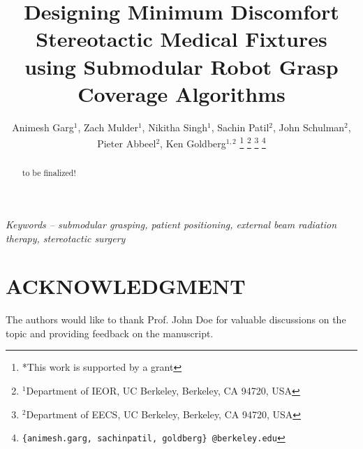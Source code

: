 \documentclass[letterpaper, 10 pt, conference]{ieeeconf}  %
\title{\LARGE \bf
Designing Minimum Discomfort Stereotactic Medical Fixtures \\
using Submodular Robot Grasp Coverage Algorithms 
}
\author{Animesh Garg$^{1}$, Zach Mulder$^{1}$, Nikitha Singh$^{1}$, Sachin Patil$^{2}$, John Schulman$^{2}$, Pieter Abbeel$^{2}$, Ken Goldberg$^{1,2}$%
\thanks{*This work is supported by a grant}%
\thanks{$^{1}$Department of IEOR, UC Berkeley,
	Berkeley, CA 94720, USA}%
\thanks{$^{2}$Department of EECS, UC Berkeley,
        Berkeley, CA 94720, USA}%
\thanks{{\tt\small \{animesh.garg, sachinpatil, goldberg\} @berkeley.edu}}%
}
\begin{document}
\maketitle
\thispagestyle{empty}
\pagestyle{empty}


\begin{abstract}
to be finalized!
\end{abstract}

\noindent \textit{ Keywords -- submodular grasping, patient positioning, 
external beam radiation therapy, stereotactic surgery}










\addtolength{\textheight}{-12cm}  

%
%
\section*{ACKNOWLEDGMENT}
The authors would like to thank Prof. John Doe for valuable discussions
on the topic and providing feedback on the manuscript. 

%

\end{document}
